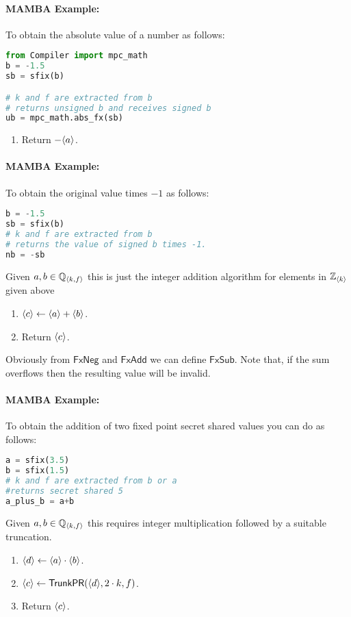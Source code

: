 \paragraph{MAMBA Example:} To obtain the absolute value of a number as follows: 
\begin{lstlisting}[language={python}]
from Compiler import mpc_math
b = -1.5
sb = sfix(b)

# k and f are extracted from b
# returns unsigned b and receives signed b
ub = mpc_math.abs_fx(sb)
\end{lstlisting}

\begin{enumerate}
\item Return $-\langle a \rangle$.
\end{enumerate}
\paragraph{MAMBA Example:} To obtain the original value times $-1$ as follows: 
\begin{lstlisting}[language={python}]
b = -1.5
sb = sfix(b)
# k and f are extracted from b
# returns the value of signed b times -1.
nb = -sb
\end{lstlisting}
Given $a, b \in {\mathbb{Q}}_{\langle k, f \rangle}$ this is just the integer addition algorithm for elements
in ${\mathbb{Z}}_{\langle k \rangle}$ given above
\begin{enumerate}
\item $\langle c \rangle \leftarrow \langle a \rangle + \langle b \rangle$.
\item Return $\langle c \rangle$.
\end{enumerate}
Obviously from $\mathsf{FxNeg}$ and $\mathsf{FxAdd}$ we can define $\mathsf{FxSub}$.
Note that, if the sum overflows then the resulting value will be
invalid.
\paragraph{MAMBA Example:} To obtain the addition of two fixed point secret shared values you can do as follows:
\begin{lstlisting}[language={python}]
a = sfix(3.5)
b = sfix(1.5)
# k and f are extracted from b or a
#returns secret shared 5
a_plus_b = a+b
\end{lstlisting}
Given $a, b \in {\mathbb{Q}}_{\langle k, f \rangle}$ this requires integer multiplication followed
by a suitable truncation.
\begin{enumerate}
\item $\langle d \rangle \leftarrow \langle a \rangle \cdot \langle b \rangle$.
\item $\langle c \rangle \leftarrow \mathsf{TrunkPR}(\langle d \rangle,2 \cdot k,f)$.
\item Return $\langle c \rangle$.
\end{enumerate}

